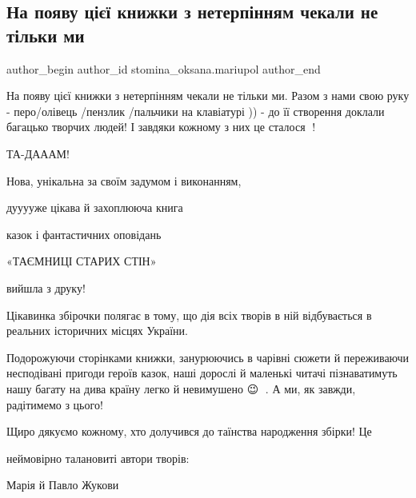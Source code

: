  
 
 
 
 

\subsection{На появу цієї книжки з нетерпінням чекали не тільки ми}
\label{sec:10_08_2021.fb.stomina_oksana.mariupol.1.na_poyavu_ts__kniz}

\ifcmt
 author_begin
   author_id stomina_oksana.mariupol
 author_end
\fi

На появу цієї книжки з нетерпінням чекали не тільки ми. Разом з нами свою руку
- перо/олівець /пензлик /пальчики на клавіатурі )) - до її створення доклали
багацько творчих людей! І завдяки кожному з них це сталося 🙂!

ТА-ДАААМ! 

Нова, унікальна за своїм задумом і виконанням, 

дууууже цікава й захоплююча книга 

казок і фантастичних оповідань

«ТАЄМНИЦІ  СТАРИХ  СТІН»

вийшла з друку!

Цікавинка збірочки полягає в тому, що дія  всіх творів в ній відбувається в
реальних історичних місцях України.

Подорожуючи сторінками книжки, занурюючись в чарівні сюжети й переживаючи
несподівані пригоди героїв казок, наші дорослі й маленькі читачі  пізнаватимуть
нашу багату на дива  країну легко й невимушено 😉 🙂. А ми, як завжди,
радітимемо з цього! 🙂

Щиро дякуємо кожному, хто долучився до таїнства народження збірки! Це

неймовірно талановиті автори творів:

Марія й Павло Жукови

